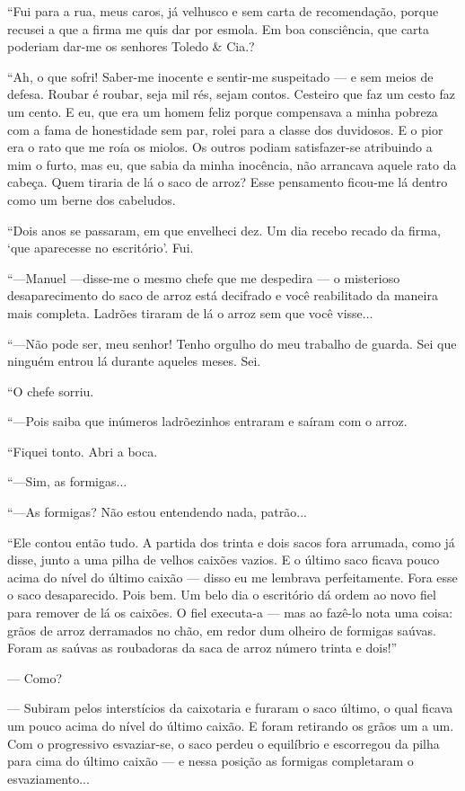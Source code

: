 ``Fui para a rua, meus caros, já velhusco e sem carta de recomendação,
porque recusei a que a firma me quis dar por esmola. Em boa consciência,
que carta poderiam dar-me os senhores Toledo \& Cia.?

``Ah, o que sofri! Saber-me inocente e sentir-me suspeitado --- e sem
meios de defesa. Roubar é roubar, seja mil rés, sejam contos. Cesteiro
que faz um cesto faz um cento. E eu, que era um homem feliz porque
compensava a minha pobreza com a fama de honestidade sem par, rolei para
a classe dos duvidosos. E o pior era o rato que me roía os miolos. Os
outros podiam satisfazer-se atribuindo a mim o furto, mas eu, que sabia
da minha inocência, não arrancava aquele rato da cabeça. Quem tiraria de
lá o saco de arroz? Esse pensamento ficou-me lá dentro como um berne dos
cabeludos.

``Dois anos se passaram, em que envelheci dez. Um dia recebo recado da
firma, `que aparecesse no escritório'. Fui.

``---Manuel ---disse-me o mesmo chefe que me despedira --- o misterioso
desaparecimento do saco de arroz está decifrado e você reabilitado da
maneira mais completa. Ladrões tiraram de lá o arroz sem que você
visse...

``---Não pode ser, meu senhor! Tenho orgulho do meu trabalho de guarda.
Sei que ninguém entrou lá durante aqueles meses. Sei.

``O chefe sorriu.

``---Pois saiba que inúmeros ladrõezinhos entraram e saíram com o arroz.

``Fiquei tonto. Abri a boca.

``---Sim, as formigas...

``---As formigas? Não estou entendendo nada, patrão...

``Ele contou então tudo. A partida dos trinta e dois sacos fora
arrumada, como já disse, junto a uma pilha de velhos caixões vazios. E o
último saco ficava pouco acima do nível do último caixão --- disso eu me
lembrava perfeitamente. Fora esse o saco desaparecido. Pois bem. Um belo
dia o escritório dá ordem ao novo fiel para remover de lá os caixões. O
fiel executa-a --- mas ao fazê-lo nota uma coisa: grãos de arroz
derramados no chão, em redor dum olheiro de formigas saúvas. Foram as
saúvas as roubadoras da saca de arroz número trinta e dois!''

--- Como?

--- Subiram pelos interstícios da caixotaria e furaram o saco último, o
qual ficava um pouco acima do nível do último caixão. E foram retirando
os grãos um a um. Com o progressivo esvaziar-se, o saco perdeu o
equilíbrio e escorregou da pilha para cima do último caixão --- e nessa
posição as formigas completaram o esvaziamento...


